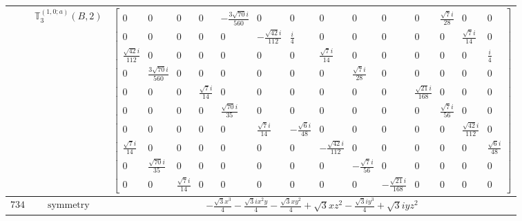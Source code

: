 \documentclass[fleqn,8pt,landscape]{jsarticle}
\begin{document}
\begin{longtable}{ccc}
$  $ & $ \mathbb{T}_{3}^{(1,0;a)}(B,2) $ & $ \begin{bmatrix} 0 & 0 & 0 & 0 & - \frac{3 \sqrt{70} i}{560} & 0 & 0 & 0 & 0 & 0 & 0 & \frac{\sqrt{7} i}{28} & 0 & 0 \\ 0 & 0 & 0 & 0 & 0 & - \frac{\sqrt{42} i}{112} & \frac{i}{4} & 0 & 0 & 0 & 0 & 0 & \frac{\sqrt{7} i}{14} & 0 \\ \frac{\sqrt{42} i}{112} & 0 & 0 & 0 & 0 & 0 & 0 & \frac{\sqrt{7} i}{14} & 0 & 0 & 0 & 0 & 0 & \frac{i}{4} \\ 0 & \frac{3 \sqrt{70} i}{560} & 0 & 0 & 0 & 0 & 0 & 0 & \frac{\sqrt{7} i}{28} & 0 & 0 & 0 & 0 & 0 \\ 0 & 0 & 0 & \frac{\sqrt{7} i}{14} & 0 & 0 & 0 & 0 & 0 & 0 & \frac{\sqrt{21} i}{168} & 0 & 0 & 0 \\ 0 & 0 & 0 & 0 & \frac{\sqrt{70} i}{35} & 0 & 0 & 0 & 0 & 0 & 0 & \frac{\sqrt{7} i}{56} & 0 & 0 \\ 0 & 0 & 0 & 0 & 0 & \frac{\sqrt{7} i}{14} & - \frac{\sqrt{6} i}{48} & 0 & 0 & 0 & 0 & 0 & \frac{\sqrt{42} i}{112} & 0 \\ \frac{\sqrt{7} i}{14} & 0 & 0 & 0 & 0 & 0 & 0 & - \frac{\sqrt{42} i}{112} & 0 & 0 & 0 & 0 & 0 & \frac{\sqrt{6} i}{48} \\ 0 & \frac{\sqrt{70} i}{35} & 0 & 0 & 0 & 0 & 0 & 0 & - \frac{\sqrt{7} i}{56} & 0 & 0 & 0 & 0 & 0 \\ 0 & 0 & \frac{\sqrt{7} i}{14} & 0 & 0 & 0 & 0 & 0 & 0 & - \frac{\sqrt{21} i}{168} & 0 & 0 & 0 & 0 \end{bmatrix} $ \\ \hline
$ 734 $ & $ \text{symmetry} $ & $ - \frac{\sqrt{3} x^{3}}{4} - \frac{\sqrt{3} i x^{2} y}{4} - \frac{\sqrt{3} x y^{2}}{4} + \sqrt{3} x z^{2} - \frac{\sqrt{3} i y^{3}}{4} + \sqrt{3} i y z^{2} $ \\

\end{longtable}
\end{document}
